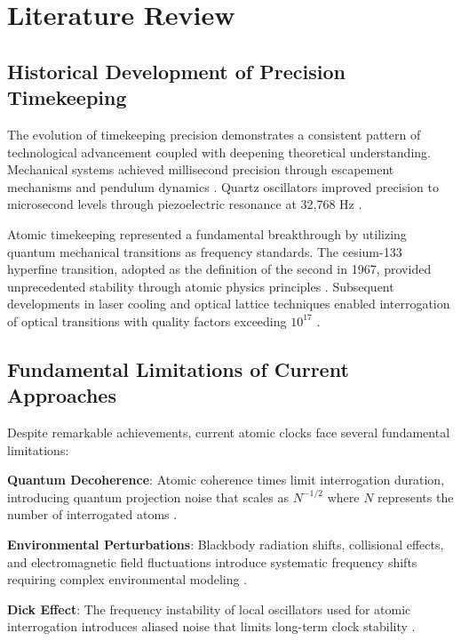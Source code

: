 \documentclass[11pt]{article}
\theoremstyle{remark}
\begin{document}
\section{Literature Review}

\subsection{Historical Development of Precision Timekeeping}

The evolution of timekeeping precision demonstrates a consistent pattern of technological advancement coupled with deepening theoretical understanding. Mechanical systems achieved millisecond precision through escapement mechanisms and pendulum dynamics \cite{turner1993time}. Quartz oscillators improved precision to microsecond levels through piezoelectric resonance at 32,768 Hz \cite{vig1993quartz}.

Atomic timekeeping represented a fundamental breakthrough by utilizing quantum mechanical transitions as frequency standards. The cesium-133 hyperfine transition, adopted as the definition of the second in 1967, provided unprecedented stability through atomic physics principles \cite{ramsey1950molecular}. Subsequent developments in laser cooling and optical lattice techniques enabled interrogation of optical transitions with quality factors exceeding $10^{17}$ \cite{dehmelt1975proposed,wineland1998experimental}.

\subsection{Fundamental Limitations of Current Approaches}

Despite remarkable achievements, current atomic clocks face several fundamental limitations:

\textbf{Quantum Decoherence}: Atomic coherence times limit interrogation duration, introducing quantum projection noise that scales as $N^{-1/2}$ where $N$ represents the number of interrogated atoms \cite{itano1993quantum}.

\textbf{Environmental Perturbations}: Blackbody radiation shifts, collisional effects, and electromagnetic field fluctuations introduce systematic frequency shifts requiring complex environmental modeling \cite{angstmann2004blackbody,rosenband2008frequency}.

\textbf{Dick Effect}: The frequency instability of local oscillators used for atomic interrogation introduces aliased noise that limits long-term clock stability \cite{dick1987local}.
\end{document}
